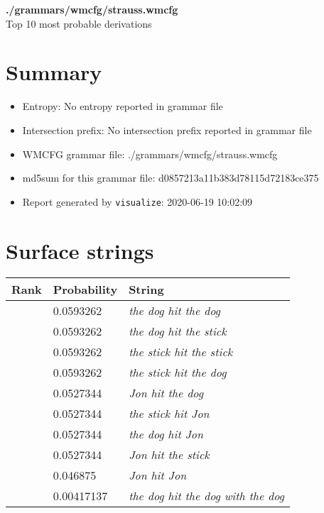 \documentclass[11pt]{article}
\begin{document}
\begin{center}
{\huge \textbf{./grammars/wmcfg/strauss.wmcfg}} \\[0.5em]
{\normalsize Top 10 most probable derivations}
\end{center}

\section{Summary}
\begin{itemize}
	\item Entropy: No entropy reported in grammar file
	\item Intersection prefix: No intersection prefix reported in grammar file
	\item WMCFG grammar file: ./grammars/wmcfg/strauss.wmcfg
	\item md5sum for this grammar file: d0857213a11b383d78115d72183ce375
	\item Report generated by \texttt{visualize}: 2020-06-19 10:02:09
\end{itemize}

\section{Surface strings}
\hspace{1em}
\renewcommand{\arraystretch}{1.15}
\newcommand\rownumber{\stepcounter{rownumber}\arabic{rownumber}}
\begin{tabular}{l l l}
	\hline
	 Rank & Probability & String \\
	\hline
\rownumber & 0.0593262 & \textit{the dog hit the dog} \\
\rownumber & 0.0593262 & \textit{the dog hit the stick} \\
\rownumber & 0.0593262 & \textit{the stick hit the stick} \\
\rownumber & 0.0593262 & \textit{the stick hit the dog} \\
\rownumber & 0.0527344 & \textit{Jon hit the dog} \\
\rownumber & 0.0527344 & \textit{the stick hit Jon} \\
\rownumber & 0.0527344 & \textit{the dog hit Jon} \\
\rownumber & 0.0527344 & \textit{Jon hit the stick} \\
\rownumber & 0.046875 & \textit{Jon hit Jon} \\
\rownumber & 0.00417137 & \textit{the dog hit the dog with the dog} \\
	\hline
\end{tabular}
\pagebreak
\end{document}
